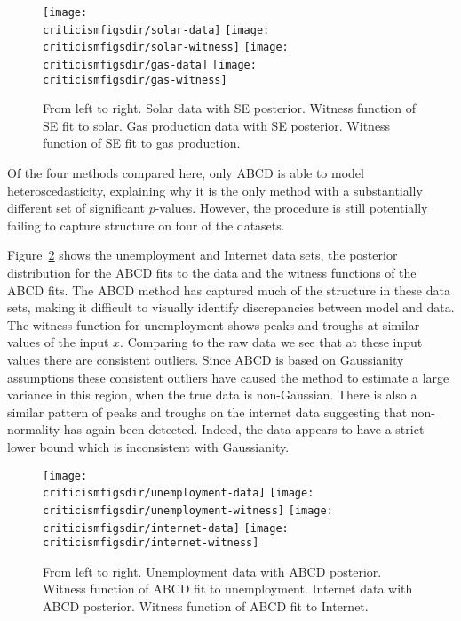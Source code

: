 \begin{figure}[ht]
\centering
\texttt{[image: \\criticismfigsdir/solar-data]}
\texttt{[image: \\criticismfigsdir/solar-witness]}
\texttt{[image: \\criticismfigsdir/gas-data]}
\texttt{[image: \\criticismfigsdir/gas-witness]}
\caption{
From left to right. Solar data with SE posterior. Witness function of SE fit to solar. Gas production data with SE posterior. Witness function of SE fit to gas production.
}
\label{fig:SE-witness}
\end{figure}

Of the four methods compared here, only ABCD is able to model heteroscedasticity, explaining why it is the only method with a substantially different set of significant $p$-values.
However, the procedure is still potentially failing to capture structure on four of the datasets.

Figure~\ref{fig:ABCD-witness} shows the unemployment and Internet data sets, the posterior distribution for the ABCD fits to the data and the witness functions of the ABCD fits.
The ABCD method has captured much of the structure in these data sets, making it difficult to visually identify discrepancies between model and data.
The witness function for unemployment shows peaks and troughs at similar values of the input $x$.
Comparing to the raw data we see that at these input values there are consistent outliers.
Since ABCD is based on Gaussianity assumptions these consistent outliers have caused the method to estimate a large variance in this region, when the true data is non-Gaussian.
There is also a similar pattern of peaks and troughs on the internet data suggesting that non-normality has again been detected.
Indeed, the data appears to have a strict lower bound which is inconsistent with Gaussianity.

\begin{figure}[ht]
\centering
\texttt{[image: \\criticismfigsdir/unemployment-data]}
\texttt{[image: \\criticismfigsdir/unemployment-witness]}
\texttt{[image: \\criticismfigsdir/internet-data]}
\texttt{[image: \\criticismfigsdir/internet-witness]}
\caption{
From left to right. Unemployment data with ABCD posterior. Witness function of ABCD fit to unemployment. Internet data with ABCD posterior. Witness function of ABCD fit to Internet.
}
\label{fig:ABCD-witness}
\end{figure}

